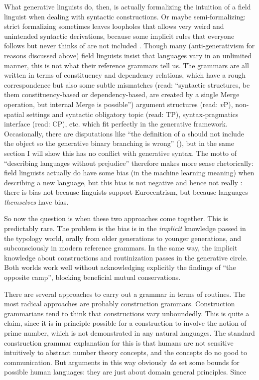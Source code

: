 \documentclass[../main.tex]{subfiles}
\begin{document}
What generative linguists do, then, is actually 
formalizing the intuition of a field linguist when dealing with syntactic constructions.
Or maybe semi-formalizing: strict formalizing sometimes leaves loopholes 
that allows very weird and unintended syntactic derivations,
because some implicit rules that everyone follows but never thinks of are not included \citep{whyformalize}.
Though many (anti-generativism for reasons discussed above) field linguists insist that 
languages vary in an unlimited manner, 
this is not what their reference grammars tell us.
The grammars are all written in terms of constituency and dependency relations, 
which have a rough correspondence but also some subtle mismatches 
(read: ``syntactic structures, be them constituency-based or dependency-based, 
are created by a single Merge operation, but internal Merge is possible'')
argument structures (read: $v$P), 
non-spatial settings and syntactic obligatory topic (read: TP),
syntax-pragmatics interface (read: CP), etc.
which fit perfectly in the generative framework. 
Occasionally, there are disputations like 
``the definition of a  should not include the object
so the generative binary branching is wrong'' 
(),
but in the same section I will show this has no conflict with generative syntax.
The motto of ``describing languages without prejudice'' therefore makes more sense rhetorically:
field linguists actually do have some bias (in the machine learning meaning) when describing a new language,
but this bias is not negative and hence not really :
there is bias not because linguists support Eurocentrism, but because languages \emph{themselves} have bias.

So now the question is when these two approaches come together.
This is predictably rare.
The problem is the bias is in the \emph{implicit} knowledge passed in the typology world, 
orally from older generations to younger generations,
and subconsciously in modern reference grammars.
In the same way, the implicit knowledge about constructions and routinization
passes in the generative circle.
Both worlds work well without acknowledging explicitly the findings of ``the opposite camp'',
blocking beneficial mutual conservations.

There are several approaches to carry out a grammar in terms of routines. 
The most radical approaches are probably construction grammars.
Construction grammarians tend to think that constructions vary unboundedly.
This is quite a claim, since it is in principle possible for a construction to involve the notion of prime number,
which is not demonstrated in any natural languages.
The standard construction grammar explanation for this is 
that humans are not sensitive intuitively to abstract number theory concepts,
and the concepts do no good to communication.
But arguments in this way obviously \emph{do} set some bounds for possible human languages:
they are just about domain general principles.
Since 
\end{document}
